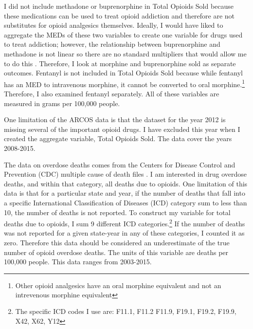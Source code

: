 \documentclass[11pt]{article}
\begin{document}
I did not include methadone or buprenorphine in Total Opioids Sold because these medications can be used to treat opioid addiction and therefore are not substitutes for opioid analgesics themselves.  Ideally, I would have liked to aggregate the MEDs of these two variables to create one variable for drugs used to treat addiction; however, the relationship between buprenorphine and methadone is not linear so there are no standard multipliers that would allow me to do this \citep{Wallera}.  Therefore, I look at morphine and buprenorphine sold as separate outcomes.  Fentanyl is not included in Total Opioids Sold because while fentanyl has an MED to intravenous morphine, it cannot be converted to oral morphine.\footnote{Other opioid analgesics have an oral morphine equivalent and not an intrevenous morphine equivalent}  Therefore, I also examined fentanyl separately.  All of these variables are measured in grams per 100,000 people.

One limitation of the ARCOS data is that the dataset for the year 2012 is missing several of the important opioid drugs. I have excluded this year when I created the aggregate variable, Total Opioids Sold.  The data cover the years 2008-2015.


The data on overdose deaths comes from the Centers for Disease Control and Prevention (CDC) multiple cause of death files \citep{CentersforDiseaseControlandPrevention2017}.  I am interested in drug overdose deaths, and within that category, all deaths due to opioids.  One limitation of this data is that for a particular state and year, if the number of deaths that fall into a specific International Classification of Diseases (ICD) category sum to less than 10, the number of deaths is not reported.  To construct my variable for total deaths due to opioids, I sum 9 different ICD categories.\footnote{The specific ICD codes I use are: F11.1, F11.2 F11.9, F19.1, F19.2, F19.9, X42, X62, Y12}  If the number of deaths was not reported for a given state-year in any of these categories, I counted it as zero.  Therefore this data should be considered an underestimate of the true number of opioid overdose deaths.  The units of this variable are deaths per 100,000 people. This data ranges from 2003-2015.  
\end{document}
